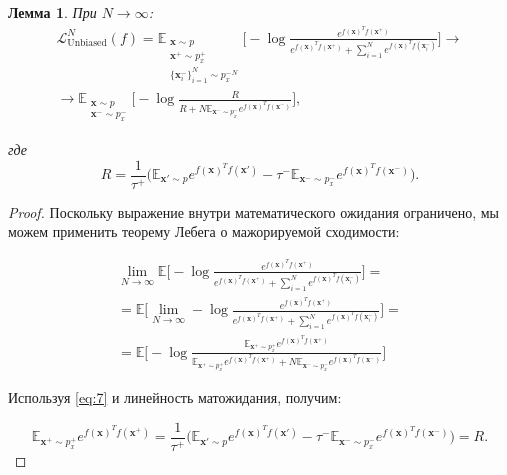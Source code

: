 \documentclass[a4paper, 14pt]{article}
\newtheorem{lemma}{Лемма}
\begin{document}
\begin{lemma}
При $N \to \infty$:
\begin{equation} \label{eq:8}
\begin{split}
\mathcal{L}_{\text{Unbiased}}^N(f) = \mathbb{E}_{\substack{\textbf{x} \sim p \\ \textbf{x}^+ \sim p_x^+ \\ \{\textbf{x}_i^-\}_{i=1}^N \sim {p_x^-}^N}} \bigg[ - \log \frac{e^{f(\textbf{x})^T f(\textbf{x}^+)}}{e^{f(\textbf{x})^T f(\textbf{x}^+)} + \sum_{i=1}^N e^{f(\textbf{x})^T f(\textbf{x}_i^-)}} \bigg] \longrightarrow \\
\longrightarrow \mathbb{E}_{\substack{\textbf{x} \sim p \\ \textbf{x}^- \sim p_x^-}} \bigg[ - \log \frac{R}{R + N \mathbb{E}_{\textbf{x}^- \sim p_x^-} e^{f(\textbf{x})^T f(\textbf{x}^-)}} \bigg],
\end{split}
\end{equation}

\noindent где
\begin{equation}\label{eq:9}
R = \frac{1}{\tau^+} \big(\mathbb{E}_{\textbf{x}' \sim p} e^{f(\textbf{x})^T f(\textbf{x}')} - \tau^- \mathbb{E}_{\textbf{x}^- \sim p_x^-} e^{f(\textbf{x})^T f(\textbf{x}^-)}\big).
\end{equation}
\end{lemma}

\renewcommand\qedsymbol{$\blacksquare$}
\begin{proof}
Поскольку выражение внутри математического ожидания ограничено, мы можем применить теорему Лебега о мажорируемой сходимости:

\begin{equation}
\begin{split}
\lim_{N \to \infty} \mathbb{E} \bigg[ - \log \frac{e^{f(\textbf{x})^T f(\textbf{x}^+)}}{e^{f(\textbf{x})^T f(\textbf{x}^+)} + \sum_{i=1}^N e^{f(\textbf{x})^T f(\textbf{x}_i^-)}} \bigg] = \\
= \mathbb{E} \bigg[ \lim_{N \to \infty} - \log \frac{e^{f(\textbf{x})^T f(\textbf{x}^+)}}{e^{f(\textbf{x})^T f(\textbf{x}^+)} + \sum_{i=1}^N e^{f(\textbf{x})^T f(\textbf{x}_i^-)}} \bigg] = \\
= \mathbb{E} \bigg[ - \log \frac{\mathbb{E}_{\textbf{x}^+ \sim p_x^+} e^{f(\textbf{x})^T f(\textbf{x}^+)}}{\mathbb{E}_{\textbf{x}^+ \sim p_x^+} e^{f(\textbf{x})^T f(\textbf{x}^+)} + N \mathbb{E}_{\textbf{x}^- \sim p_x^-} e^{f(\textbf{x})^T f(\textbf{x}^-)}}\bigg]
\end{split}
\end{equation}

Используя \ref{eq:7} и линейность матожидания, получим:

\[\mathbb{E}_{\textbf{x}^+ \sim p_x^+} e^{f(\textbf{x})^T f(\textbf{x}^+)} = \frac{1}{\tau^+} \big(\mathbb{E}_{\textbf{x}' \sim p} e^{f(\textbf{x})^T f(\textbf{x}')} - \tau^- \mathbb{E}_{\textbf{x}^- \sim p_x^-} e^{f(\textbf{x})^T f(\textbf{x}^-)}\big) = R.\]
\end{proof}
\end{document}
